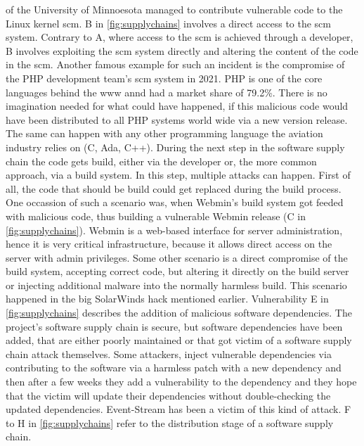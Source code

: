 \documentclass[titlepage]{report}
\begin{document}
of the University of Minnoesota managed to contribute vulnerable code to the Linux kernel \gls{scm}\cite{LinuxVulnerability}\cite{GoogleSecurityBlog}. B in \autoref{fig:supplychains} involves a direct access to the \gls{scm} system. Contrary to A, where
access to the \gls{scm} is achieved through a developer, B involves exploiting the \gls{scm} system directly and altering the content of the code in the \gls{scm}. Another famous example for such an incident is the compromise
of the PHP development team's \gls{scm} system in 2021\cite{PHPVulnerability}\cite{GoogleSecurityBlog}. PHP is one of the core languages behind the \gls{www} annd had a market share of 79.2\%\cite{PHPUsage}. There is no imagination needed for what could have
happened, if this malicious code would have been distributed to all PHP systems world wide via a new version release. The same can happen with any other programming language the aviation industry relies on (C, Ada, C++\cite{LanguagesInAerospace}).
During the next step in the software supply chain the code gets build, either via the developer or, the more common approach, via a build system. In this step, multiple attacks can happen. First of all, the code that should be build
could get replaced during the build process. One occassion of such a scenario was, when Webmin's build system got feeded with malicious code, thus building a vulnerable Webmin release (C in \autoref{fig:supplychains})\cite{WebminVulnerability}\cite{GoogleSecurityBlog}. 
Webmin is a web-based interface for server administration, hence it is very critical infrastructure, because it allows direct access on the server with admin privileges. Some other scenario is a direct compromise of the build system, accepting correct code, but altering it
directly on the build server or injecting additional malware into the normally harmless build. This scenario happened in the big SolarWinds hack mentioned earlier\cite{Sunspot}\cite{GoogleSecurityBlog}. Vulnerability E in \autoref{fig:supplychains} describes
the addition of malicious software dependencies. The project's software supply chain is secure, but software dependencies have been added, that are either poorly maintained or that got victim of a software supply chain attack themselves. Some attackers,
inject vulnerable dependencies via contributing to the software via a harmless patch with a new dependency and then after a few weeks they add a vulnerability to the dependency and they hope that the victim will update their dependencies without
double-checking the updated dependencies. Event-Stream has been a victim of this kind of attack\cite{EventStream}\cite{GoogleSecurityBlog}. F to H in \autoref{fig:supplychains} refer to the distribution stage of a software supply chain.
\end{document}
